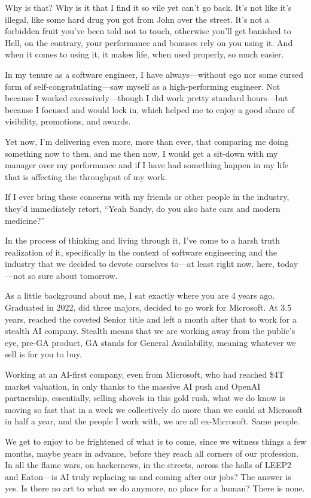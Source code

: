 \documentclass[12pt]{article}
\begin{document}
Why is that? Why is it that I find it so vile yet can't go back. It's not like
it's illegal, like some hard drug you got from John over the street. It's not a
forbidden fruit you've been told not to touch, otherwise you'll get banished to
Hell, on the contrary, your performance and bonuses rely on you using it. And
when it comes to using it, it makes life, when used properly, so much easier.

In my tenure as a software engineer, I have always---without ego nor some cursed
form of self-congratulating---saw myself as a high-performing engineer. Not
because I worked excessively---though I did work pretty standard hours---but because
I focused and would lock in, which helped me to enjoy a good share of
visibility, promotions, and awards.

Yet now, I'm delivering even more, more than ever, that comparing me doing
something now to then, and me then now, I would get a sit-down with my manager
over my performance and if I have had something happen in my life that is
affecting the throughput of my work.

If I ever bring these concerns with my friends or other people in the industry,
they'd immediately retort, ``Yeah Sandy, do you also hate cars and modern
medicine?'' 

In the process of thinking and living through it, I've come to a harsh truth
realization of it, specifically in the context of software engineering and the
industry that we decided to devote ourselves to---at least right now, here,
today---not so sure about tomorrow.

As a little background about me, I sat exactly where you are 4 years
ago. Graduated in 2022, did three majors, decided to go work for Microsoft. At
3.5 years, reached the coveted Senior title and left a month after that to work
for a stealth AI company. Stealth means that we are working away from the
public's eye, pre-GA product, GA stands for General Availability, meaning
whatever we sell is for you to buy.

Working at an AI-first company, even from Microsoft, who had reached \$4T market
valuation, in only thanks to the massive AI push and OpenAI partnership,
essentially, selling shovels in this gold rush, what we do know is moving so
fast that in a week we collectively do more than we could at Microsoft in half a
year, and the people I work with, we are all ex-Microsoft. Same people.

We get to enjoy to be frightened of what is to come, since we witness things a
few months, maybe years in advance, before they reach all corners of our
profession. In all the flame wars, on hackernews, in the streets, across the
halls of LEEP2 and Eaton---is AI truly replacing us and coming after our
jobs? The answer is yes. Is there no art to what we do anymore, no place for a
human? There is none. 
\end{document}
